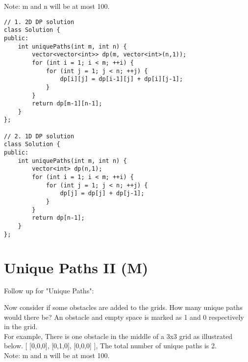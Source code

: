 Note: m and n will be at most 100.\\

\begin{lstlisting}
// 1. 2D DP solution
class Solution {
public:
    int uniquePaths(int m, int n) {
        vector<vector<int>> dp(m, vector<int>(n,1));
        for (int i = 1; i < m; ++i) {
            for (int j = 1; j < n; ++j) {
                dp[i][j] = dp[i-1][j] + dp[i][j-1];
            }
        }
        return dp[m-1][n-1];
    }
};

// 2. 1D DP solution
class Solution {
public:
    int uniquePaths(int m, int n) {
        vector<int> dp(n,1);
        for (int i = 1; i < m; ++i) {
            for (int j = 1; j < n; ++j) {
                dp[j] = dp[j] + dp[j-1];
            }
        }
        return dp[n-1];
    }
};
\end{lstlisting}


\section{Unique Paths II (M)}
Follow up for "Unique Paths":

Now consider if some obstacles are added to the grids. How many unique paths would there be? An obstacle and empty space is marked as 1 and 0 respectively in the grid.\\

For example, There is one obstacle in the middle of a 3x3 grid as illustrated below.
[
  [0,0,0],
  [0,1,0],
  [0,0,0]
], The total number of unique paths is 2.\\

Note: m and n will be at most 100.\\


